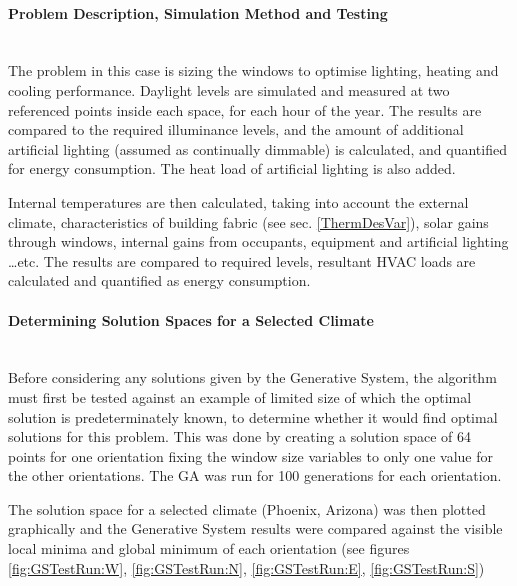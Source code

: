 \paragraph{Problem Description, Simulation Method and Testing}\mbox{}\\

The problem in this case is sizing the windows to optimise lighting, heating and cooling performance. Daylight levels are simulated and measured at two referenced points inside each space, for each hour of the year. The results are compared to the required illuminance levels, and the amount of additional artificial lighting (assumed as continually dimmable) is calculated, and quantified for energy consumption. The heat load of artificial lighting is also added.

Internal temperatures are then calculated, taking into account the external climate, characteristics of building fabric (see sec. \ref{ThermDesVar}), solar gains through windows, internal gains from occupants, equipment and artificial lighting \ldots\hspace{0cm}etc. The results are compared to required levels, resultant HVAC loads are calculated and quantified as energy consumption. 

\paragraph{Determining Solution Spaces for a Selected Climate}\mbox{}\\

Before considering any solutions given by the Generative System, the algorithm must first be tested against an example of limited size of which the optimal solution is predeterminately known, to determine whether it would find optimal solutions for this problem. This was done by creating a solution space of 64 points for one orientation fixing the window size variables to only one value for the other orientations. The GA was run for 100 generations for each orientation.

The solution space for a selected climate (Phoenix, Arizona) was then plotted graphically and the Generative System results were compared against the visible local minima and global minimum of each orientation (see figures \ref{fig:GSTestRun:W}, \ref{fig:GSTestRun:N}, \ref{fig:GSTestRun:E}, \ref{fig:GSTestRun:S})

